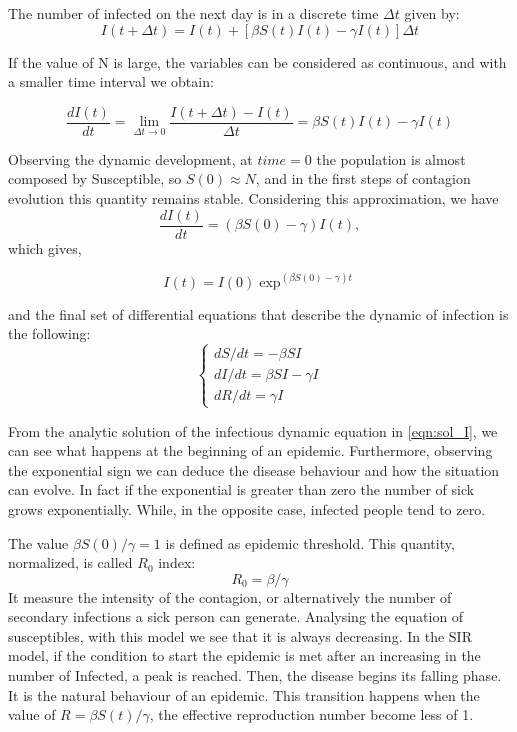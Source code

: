 The number of infected on the next day is in a discrete time $\Delta t$ given by:
\begin{equation}
	I(t+\Delta t) = I(t) + [\beta S(t)I(t) - \gamma I(t)]\Delta t
\end{equation}

If the value of N is large, the variables can be considered as continuous, and with a smaller time interval we obtain:

\begin{equation}
	\frac{d I(t)}{dt} = \lim_{\Delta t \rightarrow  0} \frac{I(t+\Delta t)-I(t)}{\Delta t} = \beta S(t) I(t)- \gamma I(t)
\end{equation}

Observing the dynamic development,  at $time = 0$ the population is almost composed by Susceptible, so $S(0) \approx N$, and in the first steps of contagion evolution this quantity remains stable. Considering this approximation, we have
\begin{equation}
		\frac{d I(t)}{dt} = (\beta S(0)-\gamma)I(t),
\end{equation} 
which gives,

\begin{equation}
	I(t) = I(0) \exp ^{(\beta S(0)- \gamma)t}
	\label{eqn:sol_I}
\end{equation}

 and the final set of differential equations that  describe the dynamic of infection is the following:
 \begin{equation}
 	\begin{cases}
 		dS / dt = -\beta S I \\
 		dI / dt = \beta S I - \gamma I\\
 		dR / dt =  \gamma I
 	\end{cases}
 \end{equation}


From the analytic solution  of the infectious dynamic equation in \ref{eqn:sol_I}, we can see what happens at the beginning of an epidemic. Furthermore, observing the exponential sign we can deduce the disease behaviour and how the situation can evolve.
In fact if the exponential is greater than zero the number of sick grows exponentially. While, in the opposite case, infected people tend to zero. 

The value $ \beta S(0)/\gamma = 1$ is defined as epidemic threshold. This quantity, normalized, is called $R_0$ index:
\begin{equation}
	R_0 = \beta/\gamma
	\label{eqn:basic_rep_number}
\end{equation}
It measure the intensity of the contagion, or alternatively the number of secondary infections a sick person can generate. Analysing the equation of susceptibles, with this model we see that it is always decreasing. In the SIR model, if the condition to start the epidemic is met after an increasing in the number of Infected, a peak is reached. Then, the disease begins its falling phase. It is the natural behaviour of an epidemic.
This transition happens when the value of $R = \beta S(t)/\gamma$, the effective reproduction number become less of 1.

